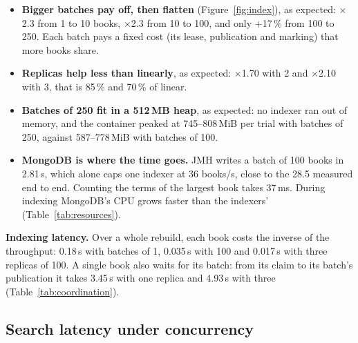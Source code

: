 \begin{itemize}
\item \textbf{Bigger batches pay off, then flatten} (Figure~\ref{fig:index}), as expected: $\times$2.3 from 1 to 10
  books, $\times$2.3 from 10 to 100, and only +17\,\% from 100 to 250. Each batch pays a fixed cost (its lease,
  publication and marking) that more books share.
\item \textbf{Replicas help less than linearly}, as expected: $\times$1.70 with 2 and $\times$2.10 with 3, that is 85\,\%
  and 70\,\% of linear.
\item \textbf{Batches of 250 fit in a 512\,MB heap}, as expected: no indexer ran out of memory, and the container
  peaked at 745--808\,MiB per trial with batches of 250, against 587--778\,MiB with batches of 100.
\item \textbf{MongoDB is where the time goes.} JMH writes a batch of 100 books in 2.81\,s, which alone caps one
  indexer at 36 books/s, close to the 28.5 measured end to end. Counting the terms of the largest book takes 37\,ms.
  During indexing MongoDB's CPU grows faster than the indexers' (Table~\ref{tab:resources}).
\end{itemize}

\textbf{Indexing latency.} Over a whole rebuild, each book costs the inverse of the throughput: 0.18\,s with batches of
1, 0.035\,s with 100 and 0.017\,s with three replicas of 100. A single book also waits for its batch: from its claim
to its batch's publication it takes 3.45\,s with one replica and 4.93\,s with three (Table~\ref{tab:coordination}).

\subsection{Search latency under concurrency}

